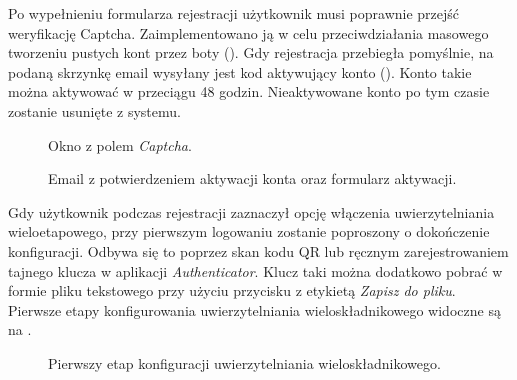 Po wypełnieniu formularza rejestracji użytkownik musi poprawnie przejść weryfikację Captcha. Zaimplementowano ją w celu
przeciwdziałania masowego tworzeniu pustych kont przez boty (). Gdy rejestracja przebiegła
pomyślnie, na podaną skrzynkę email wysyłany jest kod aktywujący konto (). Konto takie
można aktywować w przeciągu 48 godzin. Nieaktywowane konto po tym czasie zostanie usunięte z systemu.
%
\begin{figure}[H]
  \centering
  \caption{Okno z polem \textit{Captcha}.}
  \label{fig:register-captcha}
\end{figure}
%
\begin{figure}[H]
  \centering
  \begin{subfigure}[b]{0.53\textwidth}
    \centering
  \end{subfigure}
  \hfill
  \begin{subfigure}[b]{0.43\textwidth}
    \centering
  \end{subfigure}
  \caption{Email z potwierdzeniem aktywacji konta oraz formularz aktywacji.}
  \label{fig:activate-email-form}
\end{figure}


Gdy użytkownik podczas rejestracji zaznaczył opcję włączenia uwierzytelniania wieloetapowego, przy pierwszym logowaniu
zostanie poproszony o dokończenie konfiguracji. Odbywa się to poprzez skan kodu QR lub ręcznym zarejestrowaniem tajnego
klucza w aplikacji \textit{Authenticator}. Klucz taki można dodatkowo pobrać w formie pliku tekstowego przy użyciu
przycisku z etykietą \textit{Zapisz do pliku}. Pierwsze etapy konfigurowania uwierzytelniania wieloskładnikowego
widoczne są na .
%
\begin{figure}[H]
  \centering
  \begin{subfigure}[b]{0.48\textwidth}
    \centering
  \end{subfigure}
  \hfill
  \begin{subfigure}[b]{0.48\textwidth}
    \centering
  \end{subfigure}
  \caption{Pierwszy etap konfiguracji uwierzytelniania wieloskładnikowego.}
  \label{fig:mfa-settings}
\end{figure}

